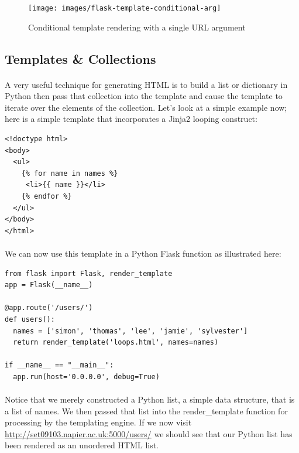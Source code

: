\documentclass[12pt, a4paper, oneside]{book}
\begin{document}
{\begin{figure}[H]
\centering
\texttt{[image: images/flask-template-conditional-arg]}
\caption{Conditional template rendering with a single URL argument}
\label{fig:flask-template-conditional-arg}
\end{figure}


\subsection{Templates \& Collections}
\label{templates-collections}
\paragraph{} A very useful technique for generating HTML is to build a list or dictionary in Python then pass that collection into the template and cause the template to iterate over the elements of the collection. Let's look at a simple example now; here is a simple template that incorporates a Jinja2 looping construct:

\begin{lstlisting}
<!doctype html>
<body>
  <ul>
    {% for name in names %}
     <li>{{ name }}</li>
    {% endfor %}
  </ul>
</body>
</html>
\end{lstlisting}

\paragraph{} We can now use this template in a Python Flask function as illustrated here:

\begin{lstlisting}
from flask import Flask, render_template
app = Flask(__name__)

@app.route('/users/')
def users():
  names = ['simon', 'thomas', 'lee', 'jamie', 'sylvester']
  return render_template('loops.html', names=names)

if __name__ == "__main__":
  app.run(host='0.0.0.0', debug=True)
\end{lstlisting}

\paragraph{} Notice that we merely constructed a Python list, a simple data structure, that is a list of names. We then passed that list into the render\_template function for processing by the templating engine. If we now visit \url{http://set09103.napier.ac.uk:5000/users/} we should see that our Python list has been rendered as an unordered HTML list.

}
\end{document}
